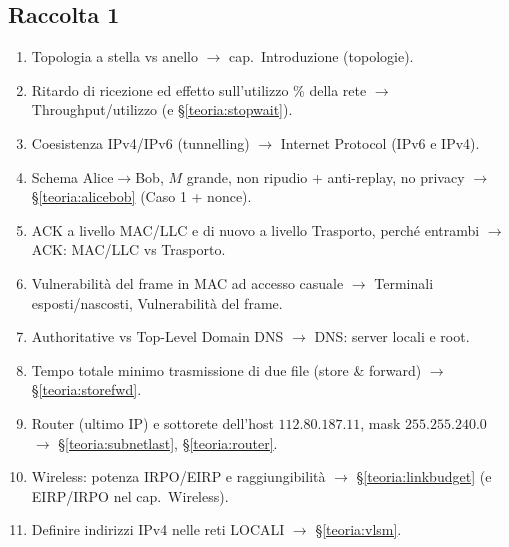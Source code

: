 \documentclass[11pt,a4paper]{report}
\begin{document}
\renewcommand{\arraystretch}{1.1}
\small

\subsection*{Raccolta 1}
\begin{enumerate}[noitemsep]
\item Topologia a stella vs anello $\to$ cap.\ Introduzione (topologie).
\item Ritardo di ricezione ed effetto sull'utilizzo \% della rete $\to$ Throughput/utilizzo (e \S\ref{teoria:stopwait}).
\item Coesistenza IPv4/IPv6 (tunnelling) $\to$ Internet Protocol (IPv6 e IPv4).
\item Schema Alice$\to$Bob, $M$ grande, non ripudio + anti-replay, no privacy $\to$ \S\ref{teoria:alicebob} (Caso 1 + nonce).
\item ACK a livello MAC/LLC e di nuovo a livello Trasporto, perché entrambi $\to$ ACK: MAC/LLC vs Trasporto.
\item Vulnerabilità del frame in MAC ad accesso casuale $\to$ Terminali esposti/nascosti, Vulnerabilità del frame.
\item Authoritative vs Top-Level Domain DNS $\to$ DNS: server locali e root.
\item Tempo totale minimo trasmissione di due file (store \& forward) $\to$ \S\ref{teoria:storefwd}.
\item Router (ultimo IP) e sottorete dell'host $112.80.187.11$, mask $255.255.240.0$ $\to$ \S\ref{teoria:subnetlast}, \S\ref{teoria:router}.
\item Wireless: potenza IRPO/EIRP e raggiungibilità $\to$ \S\ref{teoria:linkbudget} (e EIRP/IRPO nel cap.\ Wireless).
\item Definire indirizzi IPv4 nelle reti LOCALI $\to$ \S\ref{teoria:vlsm}.
\end{enumerate}
\end{document}
